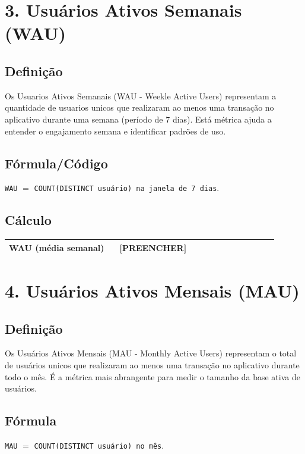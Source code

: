 \documentclass[12pt]{article}
\providecommand{\WAUMedio}{[PREENCHER]}
\begin{document}
\section*{3. Usuários Ativos Semanais (WAU)}
\subsection*{Definição}
Os Usuarios Ativos Semanais (WAU - Weekle Active Users) representam a quantidade de usuarios unicos que realizaram ao menos uma transação no aplicativo durante uma semana (período de 7 dias). Está métrica ajuda a entender o engajamento semana e identificar padrões de uso.

\subsection*{Fórmula/Código}
\noindent \texttt{WAU} $=$ \texttt{COUNT(DISTINCT usuário) na janela de 7 dias}. 

\subsection*{Cálculo}
\begin{center}
\begin{tabular}{>{\bfseries}p{0.37\linewidth} p{0.53\linewidth}}
\toprule
WAU (média semanal) & \WAUMedio \\
\bottomrule
\end{tabular}
\end{center}

\section*{4. Usuários Ativos Mensais (MAU)}
\subsection*{Definição}
Os Usuários Ativos Mensais (MAU - Monthly Active Users) representam o total de usuários unicos que realizaram ao menos uma transação no aplicativo durante todo o mês. É a métrica mais abrangente para medir o tamanho da base ativa de usuários.

\subsection*{Fórmula}
\noindent \texttt{MAU} $=$ \texttt{COUNT(DISTINCT usuário) no mês}.
\end{document}
